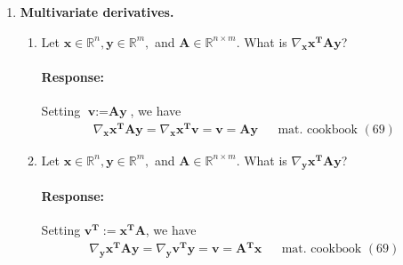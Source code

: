 \documentclass [11pt] {article}
\newcommand{\R}{\mathbb{R}}
\newcommand{\T}{\bf{T}}
\newcommand{\A}{\bf{A}}
\newcommand{\AT}{\bf{A$^{\T}$}}
\newcommand{\x}{\bf{x}}
\newcommand{\y}{\bf{y}}
\newenvironment{response}{\begin{responseframe}\vspace{-10pt}\paragraph{Response:}}{\end{responseframe}}
\renewcommand{\bf}[1]{\textbf{{#1}}}
\begin{document}
\begin{enumerate}
    \item \bf{Multivariate derivatives.}
        \begin{enumerate}[itemsep=10pt]
            \item Let $\x \in \R^n, \y \in \R^m,$ and $\A \in \R^{n \times m}$. 
                What is $\nabla_{\x} \x^{\T} \A \y$?
                \begin{response}
                    Setting $\bf{v} := \A \y$, we have
                    \begin{align*}
                        \nabla_{\x} \x^{\T} \A \y = \nabla_{\x} \x^{\T} \bf{v}  = \bf{v} = \A \y && \text{mat. cookbook } (69)
                    \end{align*}
                \end{response}

                \newpage
            \item Let $\x \in \R^n, \y \in \R^m,$ and $\A \in \R^{n \times m}$. 
                What is $\nabla_{\y} \x^{\T} \A \y$?
                \begin{response}
                    Setting $\bf{v}^{\T} := \x^{\T} \A$, we have
                    \begin{align*}
                        \nabla_{\y} \x^{\T} \A \y = \nabla_{\y} \bf{v}^{\T} \y = \bf{v} = \AT \x && \text{mat. cookbook } (69)
                    \end{align*}
                \end{response}


\end{enumerate}
\end{enumerate}
\end{document}
